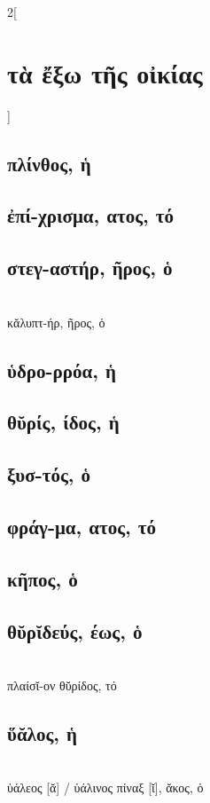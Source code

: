 \documentclass{book}
\begin{document}
\begin{multicols}{2}[\section{τὰ ἔξω τῆς οἰκίας}]
\subsection{πλίνθος, ἡ}
\subsection{ἐπί-χρισμα, ατος, τό}
\subsection{στεγ-αστήρ, ῆρος, ὁ}
 ~\\
κᾰλυπτ-ήρ, ῆρος, ὁ 
\subsection{ὑδρο-ρρόα, ἡ}
\subsection{θῠρίς, ίδος, ἡ}
\subsection{ξυσ-τός, ὁ}
\subsection{φράγ-μα, ατος, τό}
\subsection{κῆπος, ὁ}
\subsection{θῠρῐδεύς, έως, ὁ}
 ~\\
{πλαίσῐ-ον θῠρίδος, τό}
\subsection{ὕᾰλος, ἡ}
 ~\\
ὑάλεος [ᾰ] / ὑάλινος  πίναξ [ῐ], ᾰκος, ὁ 
~
\end{multicols}
\newpage  
\end{document}
